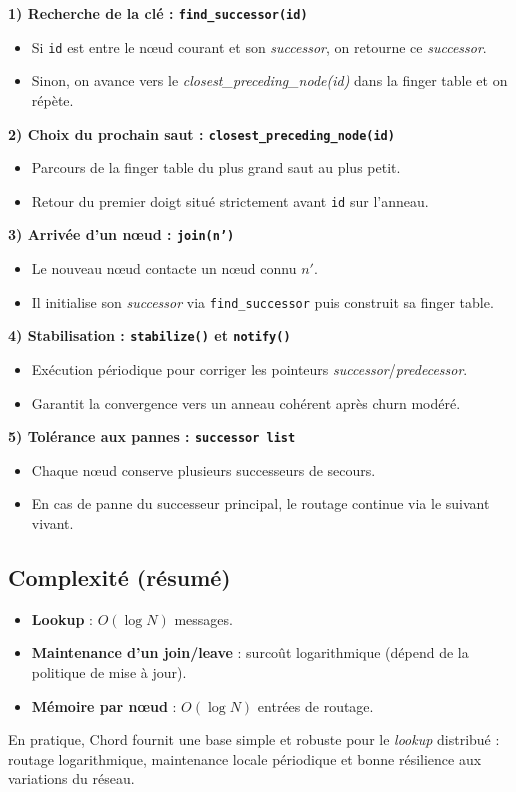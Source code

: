 \textbf{1) Recherche de la cl\'e : \texttt{find\_successor(id)}}
\begin{itemize}
\item Si \texttt{id} est entre le n\oe ud courant et son \emph{successor}, on retourne ce \emph{successor}.
\item Sinon, on avance vers le \emph{closest\_preceding\_node(id)} dans la finger table et on r\'ep\`ete.
\end{itemize}

\textbf{2) Choix du prochain saut : \texttt{closest\_preceding\_node(id)}}
\begin{itemize}
\item Parcours de la finger table du plus grand saut au plus petit.
\item Retour du premier doigt situ\'e strictement avant \texttt{id} sur l'anneau.
\end{itemize}

\textbf{3) Arriv\'ee d'un n\oe ud : \texttt{join(n')}}
\begin{itemize}
\item Le nouveau n\oe ud contacte un n\oe ud connu \(n'\).
\item Il initialise son \emph{successor} via \texttt{find\_successor} puis construit sa finger table.
\end{itemize}

\textbf{4) Stabilisation : \texttt{stabilize()} et \texttt{notify()}}
\begin{itemize}
\item Ex\'ecution p\'eriodique pour corriger les pointeurs \emph{successor}/\emph{predecessor}.
\item Garantit la convergence vers un anneau coh\'erent apr\`es churn mod\'er\'e.
\end{itemize}

\textbf{5) Tol\'erance aux pannes : \texttt{successor list}}
\begin{itemize}
\item Chaque n\oe ud conserve plusieurs successeurs de secours.
\item En cas de panne du successeur principal, le routage continue via le suivant vivant.
\end{itemize}

\subsection{Complexit\'e (r\'esum\'e)}
\begin{itemize}
\item \textbf{Lookup} : \(O(\log N)\) messages.
\item \textbf{Maintenance d'un join/leave} : surco\^ut logarithmique (d\'epend de la politique de mise \`a jour).
\item \textbf{M\'emoire par n\oe ud} : \(O(\log N)\) entr\'ees de routage.
\end{itemize}

En pratique, Chord fournit une base simple et robuste pour le \emph{lookup} distribu\'e : routage logarithmique, maintenance locale p\'eriodique et bonne r\'esilience aux variations du r\'eseau.